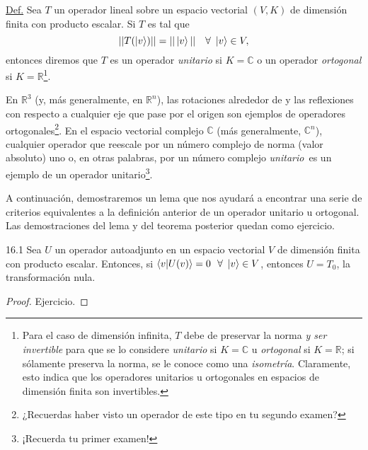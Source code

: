\documentclass[12pt,libertine]{book}
\begin{document}
\begin{tcolorbox}
\underline{Def.} Sea $T$ un operador lineal sobre un espacio vectorial $(V,K)$ de dimensión finita con producto escalar. Si $T$ es tal que \[
    ||T(\ket{v})|| = ||\ket{v}|| \ \ \ \forall \ \ket{v}\in V,
\] entonces diremos que $T$ es un operador \emph{unitario} si $K=\mathbb{C}$ o un operador \emph{ortogonal} si $K=\mathbb{R}$\footnote{Para el caso de dimensión infinita, $T$ debe de preservar la norma \emph{y ser invertible} para que se lo considere \emph{unitario} si $K=\mathbb{C}$ u \emph{ortogonal} si $K=\mathbb{R}$; si sólamente preserva la norma, se le conoce como una \emph{isometría}. Claramente, esto indica que los operadores unitarios u ortogonales en espacios de dimensión finita son invertibles.}.
\end{tcolorbox}

En $\mathbb{R}^3$ (y, más generalmente, en $\mathbb{R}^n$), las rotaciones alrededor de y las reflexiones con respecto a cualquier eje que pase por el origen son ejemplos de operadores ortogonales\footnote{¿Recuerdas haber visto un operador de este tipo en tu segundo examen?}. En el espacio vectorial complejo $\mathbb{C}$ (más generalmente, $\mathbb{C}^n$), cualquier operador que reescale por un número complejo de norma (valor absoluto) uno \textemdash o, en otras palabras, por un número complejo \emph{unitario}\textemdash \ es un ejemplo de un operador unitario\footnote{¡Recuerda tu primer examen!}.

\vspace{3mm}
A continuación, demostraremos un lema que nos ayudará a encontrar una serie de criterios equivalentes a la definición anterior de un operador unitario u ortogonal. Las demostraciones del lema y del teorema posterior quedan como ejercicio.

\begin{Lema} {16.1}
    Sea $U$ un operador autoadjunto en un espacio vectorial $V$ de dimensión finita con producto escalar. Entonces, si $\braket{v|U(v)}=0 \ \ \forall \ \ket{v}\in V$, entonces $U=T_0$, la transformación nula. 
\end{Lema}

\begin{proof}
    Ejercicio.
\end{proof}
\end{document}
